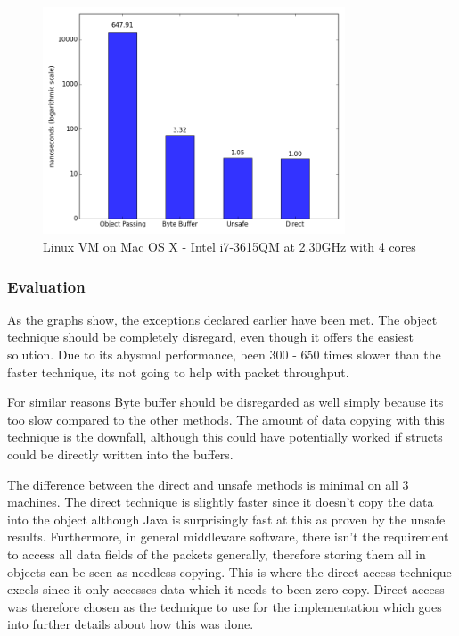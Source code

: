 \documentclass[final_report.tex]{subfiles}
\begin{document}
\begin{figure}[H]
	\centering
	\includegraphics[width=0.8\textwidth]{img/vm.png}
	\caption{Linux VM on Mac OS X - Intel i7-3615QM at 2.30GHz with 4 cores}
	\label{fig:res3}
\end{figure}

\subsubsection{Evaluation}
As the graphs show, the exceptions declared earlier have been met. The object technique should be completely disregard, even though it offers the easiest solution. Due to its abysmal performance, been 300 - 650 times slower than the faster technique, its not going to help with packet throughput.

For similar reasons Byte buffer should be disregarded as well simply because its too slow compared to the other methods. The amount of data copying with this technique is the downfall, although this could have potentially worked if structs could be directly written into the buffers. 

The difference between the direct and unsafe methods is minimal on all 3 machines. The direct technique is slightly faster since it doesn't copy the data into the object although Java is surprisingly fast at this as proven by the unsafe results. Furthermore, in general middleware software, there isn't the requirement to access all data fields of the packets generally, therefore storing them all in objects can be seen as needless copying. This is where the direct access technique excels since it only accesses data which it needs to been zero-copy. Direct access was therefore chosen as the technique to use for the implementation which goes into further details about how this was done.
\end{document}

